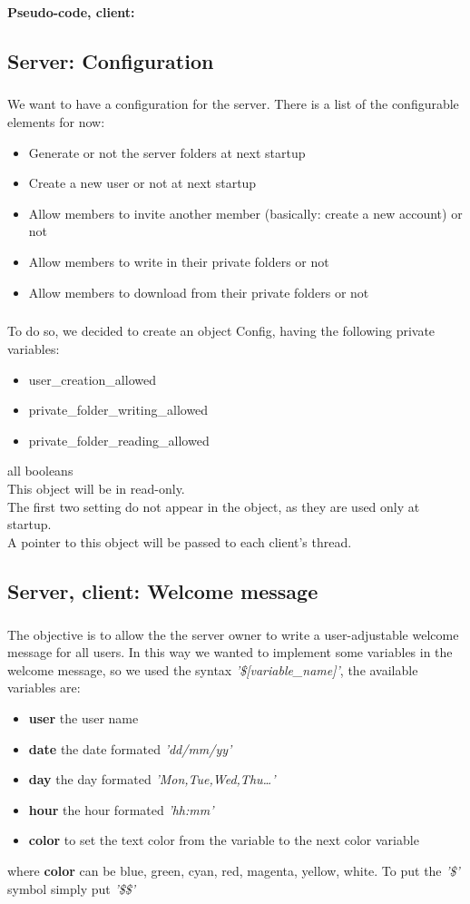 \documentclass[12pt,a4paper,twoside]{article}
\begin{document}
			\paragraph*{Pseudo-code, client:}
				
		\subsection{Server: Configuration} %
			\subparagraph*{}
				We want to have a configuration for the server. There is a list of the configurable elements for now:
				\begin{itemize}
					\item{} Generate or not the server folders at next startup
					\item{} Create a new user or not at next startup
					\item{} Allow members to invite another member (basically: create a new account) or not
					\item{} Allow members to write in their private folders or not
					\item{} Allow members to download from their private folders or not
				\end{itemize}
			\subparagraph*{}
				To do so, we decided to create an object Config, having the following private variables:
				\begin{itemize}
					\item{} user\_creation\_allowed
					\item{} private\_folder\_writing\_allowed
					\item{} private\_folder\_reading\_allowed
				\end{itemize}
				all booleans\\
				This object will be in read-only.\\
				The first two setting do not appear in the object, as they are used only at startup.\\
				A pointer to this object will be passed to each client's thread.
		\subsection{Server, client: Welcome message} %
			\subparagraph*{}
				The objective is to allow the the server owner to write a user-adjustable welcome message for all users.
				In this way we wanted to implement some variables in the welcome message, so we used the syntax \textit{'\$[variable\_name]'}, the available variables are:
				\begin{itemize}
					\item{} \textbf{user} the user name
					\item{} \textbf{date} the date formated \textit{'dd/mm/yy'}
					\item{} \textbf{day} the day formated \textit{'Mon,Tue,Wed,Thu\ldots'}
					\item{} \textbf{hour} the hour formated \textit{'hh:mm'}
					\item{} \textbf{color} to set the text color from the variable to the next color variable
				\end{itemize}
				where \textbf{color} can be blue, green, cyan, red, magenta, yellow, white.
				To put the \textit{'\$'} symbol simply put \textit{'\$\$'}
\end{document}
